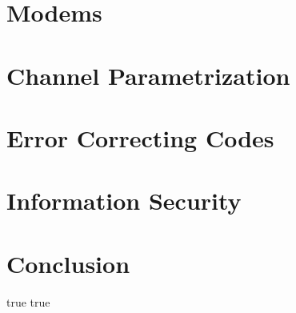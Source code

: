 \documentclass[a4paper,fleqn,english]{book}
\begin{document}
\chapter{Modems}%
%
%
\chapter{Channel Parametrization}%
%
%
\chapter{Error Correcting Codes}

%
\chapter{Information Security}

%
\chapter{Conclusion} \label{sec:txtConclusion}%
%
%
%
\nocite{*} %
\literaturverzeichnis%
{true} %
%
%
%
\bezeichnungenChapter%
{true} %
{}




\end{document}
